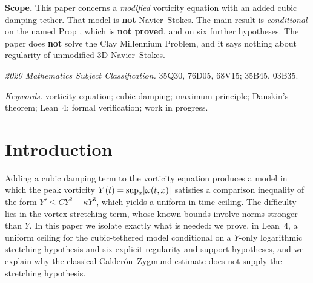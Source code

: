\documentclass[11pt]{article}
\begin{document}

\begin{scopebox}
\textbf{Scope.} This paper concerns a \emph{modified} vorticity equation with an added cubic damping tether. That model is \textbf{not} Navier--Stokes. The main result is \emph{conditional} on the named Prop , which is \textbf{not proved}, and on six further hypotheses. The paper does \textbf{not} solve the Clay Millennium Problem, and it says nothing about regularity of unmodified 3D Navier--Stokes.
\end{scopebox}

\begin{abstract}
In the Lean~4/Mathlib~\cite{Lean4,Mathlib2020} repository  (commit ), we prove a uniform-in-time ceiling on $\sup\abs{\omega}$ for a vorticity model with cubic tether $-\kappa\abs{\omega}^2\omega$ (). It is conditional on a pointwise log-loss stretching Prop and on six regularity, support and sign hypotheses, which we list verbatim. We explain why the known Calder\'on--Zygmund estimate does not supply the stretching Prop. The axioms used are only ,  and .
\end{abstract}
\begin{mscblock}\textit{2020 Mathematics Subject Classification.} 35Q30, 76D05, 68V15; 35B45, 03B35.\par
\textit{Keywords.} vorticity equation; cubic damping; maximum principle; Danskin's theorem; Lean~4; formal verification; work in progress.
\end{mscblock}

\section{Introduction}
Adding a cubic damping term to the vorticity equation produces a model in which the peak vorticity $Y(t)=\sup_x\lvert\omega(t,x)\rvert$ satisfies a comparison inequality of the form $Y'\le CY^2-\kappa Y^3$, which yields a uniform-in-time ceiling. The difficulty lies in the vortex-stretching term, whose known bounds involve norms stronger than $Y$. In this paper we isolate exactly what is needed: we prove, in Lean~4, a uniform ceiling for the cubic-tethered model conditional on a $Y$-only logarithmic stretching hypothesis and six explicit regularity and support hypotheses, and we explain why the classical Calder\'on--Zygmund estimate does not supply the stretching hypothesis.
\end{document}
